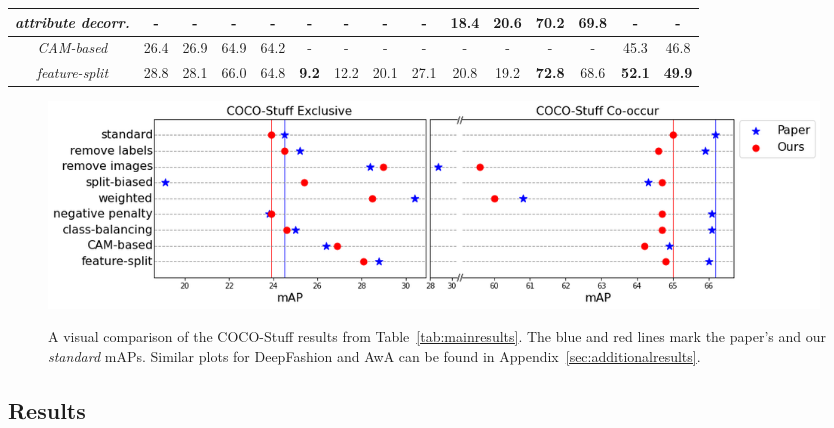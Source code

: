 \begin{table}[t!]
{\begin{tabular}{|c|cc|cc|cc|cc|cc|cc|cc|}
\textit{attribute decorr.} & -    & -    & -    & -    & -   & -   & -    & - & 18.4 & 20.6 & 70.2 & \textbf{69.8} & -    & - \\
\hline
\textit{CAM-based}         & 26.4 & 26.9 & 64.9 & 64.2 & -   & -   & -    & - & -    & -    & -    & -    & 45.3 & 46.8 \\
\textit{feature-split}     & 28.8 & 28.1 & 66.0 & 64.8 & \textbf{9.2} & 12.2   & 20.1 & 27.1 & 20.8 & 19.2 & \textbf{72.8} & 68.6 & \textbf{52.1} & \textbf{49.9} \\
\hline
\end{tabular}
}
\end{table}

\setlength{\floatsep}{10pt}

\begin{figure}[t!]
    \centering
    \caption{A visual comparison of the COCO-Stuff results from Table~\ref{tab:mainresults}. The blue and red lines mark the paper's and our \textit{standard} mAPs. Similar plots for DeepFashion and AwA can be found in Appendix~\ref{sec:additionalresults}.}
    \includegraphics[width=0.99\textwidth]{../openreview/images/COCOStuff_maP_comparisons.png}
    \label{fig:COCOStuff-mAPs}
\end{figure}

\setlength{\textfloatsep}{20pt}


\subsection{Results} \label{sec:mainresults}


